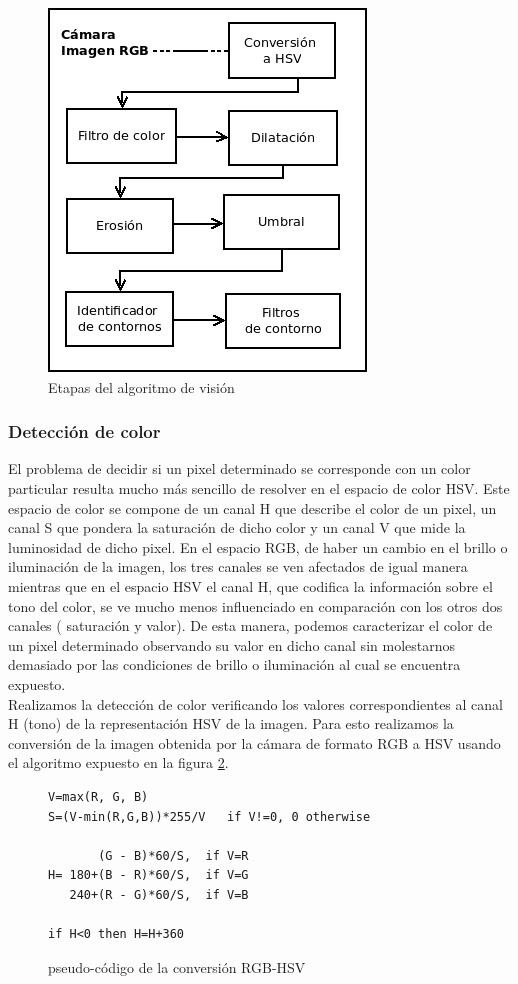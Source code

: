 \begin{figure}[tpb]
\begin{center}
  \includegraphics[scale=0.6]{figuras/vision-flow.png}
\end{center}
  \caption{Etapas del algoritmo de visión}
  \label{fig:alg_steps}
\end{figure}


\subsubsection{\label{sec:color} Detección de color}
El problema de decidir si un pixel determinado se corresponde con un 
color particular resulta mucho más sencillo de resolver en el espacio 
de color HSV. Este espacio de color se compone de un canal H que 
describe el color de un pixel, un canal S que pondera la saturación de 
dicho color y un canal V que mide la luminosidad de dicho pixel. En el espacio RGB, de haber un cambio en el brillo o 
iluminación de la imagen, los tres canales se ven afectados de igual 
manera mientras que en el espacio HSV el canal H, que codifica la 
información sobre el tono del color, se ve mucho menos influenciado en 
comparación con los otros dos canales ( saturación y valor). De esta 
manera, podemos caracterizar el color de un pixel determinado 
observando su valor en dicho canal sin molestarnos demasiado por las condiciones de brillo o iluminación al cual se encuentra expuesto.
\\ \indent Realizamos la detección de color verificando los valores correspondientes al canal H (tono) de la representación HSV de la imagen. Para esto realizamos la conversión de la imagen obtenida por la cámara  de formato RGB a HSV usando el algoritmo expuesto en la figura \ref{code:hsv}.
\begin{figure}[tpb]
\begin{verbatim}
V=max(R, G, B)
S=(V-min(R,G,B))*255/V   if V!=0, 0 otherwise

       (G - B)*60/S,  if V=R
H= 180+(B - R)*60/S,  if V=G
   240+(R - G)*60/S,  if V=B

if H<0 then H=H+360
\end{verbatim}
\caption{\label{code:hsv}pseudo-código de la conversión RGB-HSV}
\end{figure}

